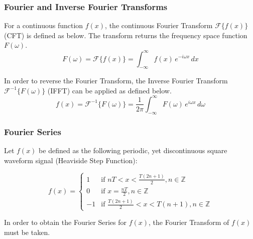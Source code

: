 \subsubsection{Fourier and Inverse Fourier Transforms}
\begin{definition}
    For a continuous function $f(x)$, the continuous Fourier Transform $\mathcal{F}\{ f(x) \}$ (CFT) is defined as below. The transform returns the frequency space function $F(\omega)$.
    \begin{equation} \label{eq:fourier_transform}
        F(\omega) = \mathcal{F}\{ f(x) \} = \int_{-\infty}^{\infty} f(x)  \, e^{-i \omega x} \,dx
    \end{equation}
\end{definition}


\begin{definition}
    In order to reverse the Fourier Transform, the Inverse Fourier Transform $\mathcal{F}^{-1}\{ F(\omega) \}$ (IFFT) can be applied as defined below.
    \begin{equation} \label{eq:inverse_fourier_transform}
        f(x) = \mathcal{F}^{-1}\{ F(\omega) \} = \frac{1}{2\pi} \int_{-\infty}^{\infty} F(\omega) \, e^{i \omega x} \,d \omega
    \end{equation}
\end{definition}

\subsubsection{Fourier Series}
Let \(f(x)\) be defined as the following periodic, yet discontinuous square waveform signal (Heaviside Step Function):

\begin{equation} \label{eq:heaviside_step}
f(x)=
    \begin{cases}
        1 & \text{if } nT < x < \frac{T(2n+1)}{2} , n \in \mathbb{Z}\\
        0 & \text{if } x = \frac{nT}{2} , n \in \mathbb{Z}\\
        -1 & \text{if } \frac{T(2n+1)}{2} < x < T(n+1) , n \in \mathbb{Z}
    \end{cases}
\end{equation}

In order to obtain the Fourier Series for \(f(x)\), the Fourier Transform of \(f(x)\) must be taken.

